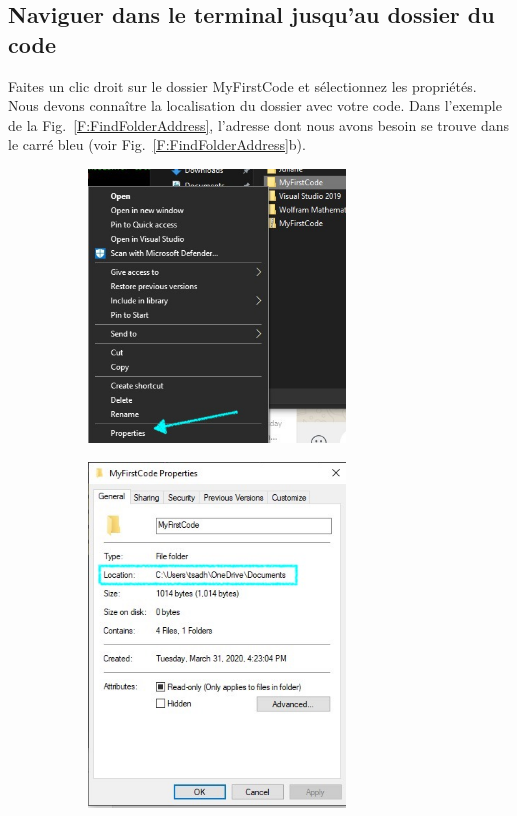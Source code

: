 \documentclass{article}
\newcommand\subfig[2]{{Fig.~\ref{#1}{#2}}}
\newcommand\fig[1]{{Fig.~\ref{#1}}}
\begin{document}
\subsection{Naviguer dans le terminal jusqu'au dossier du code\label{S:GoToFolder}}
Faites un clic droit sur le dossier MyFirstCode et sélectionnez les propriétés. Nous devons connaître la localisation du dossier avec votre code. Dans l'exemple de la \fig{F:FindFolderAddress}, l'adresse dont nous avons besoin se trouve dans le carré bleu (voir \subfig{F:FindFolderAddress}{b}).
\begin{figure}[H]
\begin{subfigure}[c]{0.5\textwidth}
\includegraphics[width=0.75\textwidth]{Plots/FirstCode_3Properties.jpg}
\end{subfigure}
\begin{subfigure}[c]{0.5\textwidth}
\includegraphics[width=0.75\textwidth]{Plots/FirstCode_4Path.jpg}

\end{subfigure}
\end{figure}
\end{document}
